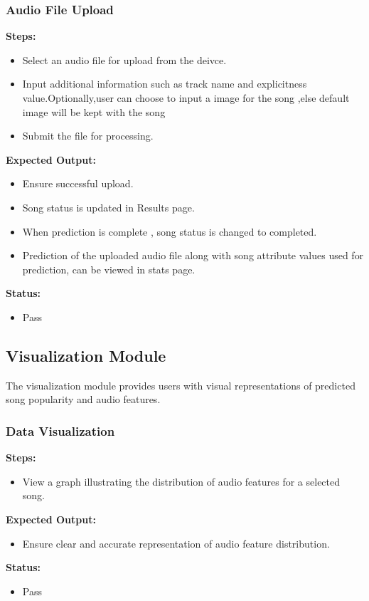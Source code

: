 \documentclass[11pt]{report}
\begin{document}
\subsubsection*{Audio File Upload}
\textbf{Steps:}
\begin{itemize}
    \item Select an audio file for upload from the deivce.
    \item Input additional information such as track name and explicitness value.Optionally,user can choose to input a image for the song ,else default image will be kept with the song
    \item Submit the file for processing.
\end{itemize}
\textbf{Expected Output:}
\begin{itemize}
    \item Ensure successful upload.
    \item Song status is updated in Results page.
    \item When prediction is complete , song status is changed to completed.
    \item Prediction of the uploaded audio file along with song attribute values used for prediction, can be viewed in stats page.
\end{itemize}
\textbf{Status:}
\begin{itemize}
    \item Pass
\end{itemize}

\subsection{Visualization Module}
The visualization module provides users with visual representations of predicted song popularity and audio features.

\subsubsection*{Data Visualization}
\textbf{Steps:}
\begin{itemize}
    \item View a graph illustrating the distribution of audio features for a selected song.
\end{itemize}
\textbf{Expected Output:}
\begin{itemize}
    \item Ensure clear and accurate representation of audio feature distribution.
\end{itemize}
\textbf{Status:}
\begin{itemize}
    \item Pass
\end{itemize}
\end{document}
